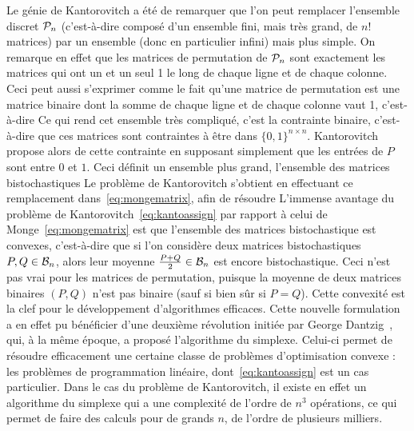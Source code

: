 Le génie de Kantorovitch a été de remarquer que l'on peut remplacer l'ensemble discret $\mathcal{P}_n$ (c'est-à-dire composé d'un ensemble fini, mais très grand, de $n!$ matrices) par un ensemble  (donc en particulier infini) mais plus simple. On remarque en effet que les matrices de permutation de $\mathcal{P}_n$ sont exactement les matrices qui ont un et un seul 1 le long de chaque ligne et de chaque colonne. Ceci peut aussi s'exprimer comme le fait qu'une matrice de permutation est une matrice binaire dont la somme de chaque ligne et de chaque colonne vaut 1, c'est-à-dire
Ce qui rend cet ensemble très compliqué, c'est la contrainte binaire, c'est-à-dire que ces matrices sont contraintes à être dans $\{0,1\}^{n \times n}$. Kantorovitch propose alors de  cette contrainte en supposant simplement que les entrées de $P$ sont entre $0$ et $1$. Ceci définit un ensemble plus grand, l'ensemble des matrices bistochastiques 
Le problème de Kantorovitch s'obtient en effectuant ce remplacement dans~\eqref{eq:mongematrix}, afin de résoudre 
L'immense avantage du problème de Kantorovitch~\eqref{eq:kantoassign} par rapport à celui de Monge~\eqref{eq:mongematrix} est que l'ensemble des matrices bistochastique est convexes, c'est-à-dire que si l'on considère deux matrices bistochastiques $P,Q \in \mathcal{B}_n$, alors leur moyenne $\frac{P+Q}{2} \in \mathcal{B}_n$ est encore bistochastique. Ceci n'est pas vrai pour les matrices de permutation, puisque la moyenne de deux matrices binaires $(P,Q)$ n'est pas binaire (sauf si bien sûr si $P=Q$). Cette convexité est la clef pour le développement d'algorithmes efficaces. 
%
Cette nouvelle formulation a en effet pu bénéficier d'une deuxième révolution initiée par George Dantzig~\cite{Dantzig51}, qui, à la même époque, a proposé l'algorithme du simplexe. Celui-ci permet de résoudre efficacement une certaine classe de problèmes d'optimisation convexe : les problèmes de programmation linéaire, dont~\eqref{eq:kantoassign} est un cas particulier. Dans le cas du problème de Kantorovitch, il existe en effet un algorithme du simplexe qui a une complexité de l'ordre de $n^3$ opérations, ce qui permet de faire des calculs pour de grands $n$, de l'ordre de plusieurs milliers. 


